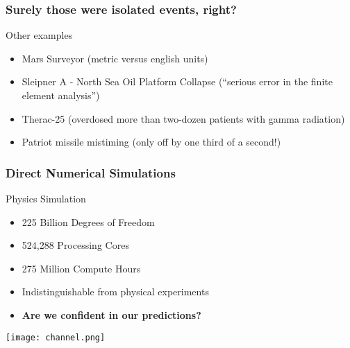 \documentclass[mathserif]{beamer}
\begin{document}
 \begin{frame}
   \frametitle{Surely those were isolated events, right?}
  \begin{block}{Other examples}
    \begin{itemize}
    \item Mars Surveyor (metric versus english units)
    \item Sleipner A - North Sea Oil Platform Collapse (``serious error in the finite element analysis'')
    \item Therac-25 (overdosed more than two-dozen patients with gamma radiation)
    \item Patriot missile mistiming (only off by one third of a second!)
    \end{itemize}
    \end{block}
 \end{frame}

\begin{frame}
  \frametitle{Direct Numerical Simulations}

      \begin{block}{Physics Simulation}
        \begin{itemize}
	 \item 225 Billion Degrees of Freedom
	 \item 524,288 Processing Cores
	 \item 275 Million Compute Hours
	 \item Indistinguishable from physical experiments

	 \item {\bf Are we confident in our predictions?}
        \end{itemize}
      \end{block}
 \begin{center}
  \center
  \texttt{[image: channel.png]}\\
 \end{center}
\end{frame}
\end{document}
